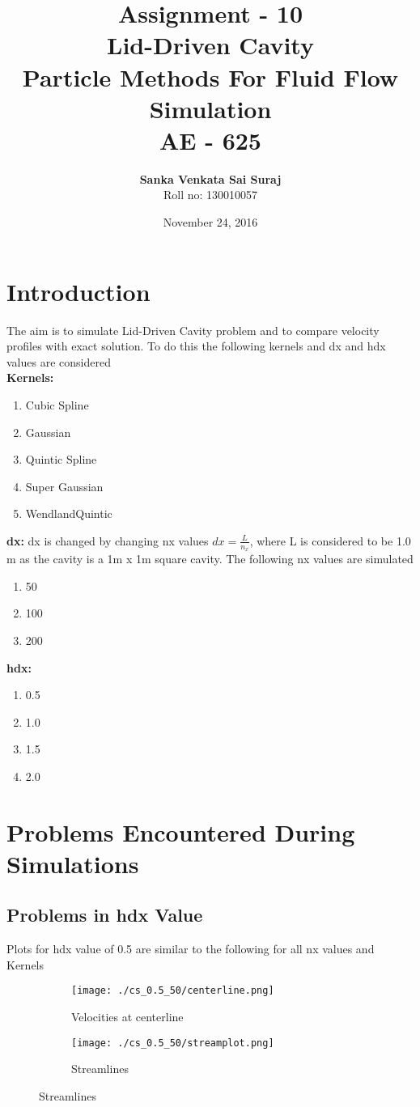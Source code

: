 \documentclass[12pt, a4paper]{report}
\title{\huge \textbf{Assignment - 10} \\[0.2in]
		\large \textbf{Lid-Driven Cavity} \\[0.5in]
		\large Particle Methods For Fluid Flow Simulation \\
		\large \textbf{AE - 625}	}
\author{\textbf{Sanka Venkata Sai Suraj} \\
		Roll no: 130010057 }
\date{November 24, 2016}
\begin{document}
\maketitle
\tableofcontents

\chapter{Introduction}

The aim is to simulate Lid-Driven Cavity problem and to compare velocity profiles with exact solution. To do this the following kernels and dx and hdx values are considered\\
\textbf{Kernels:}
\begin{enumerate}
	\item Cubic Spline
	\item Gaussian
	\item Quintic Spline
	\item Super Gaussian
	\item WendlandQuintic
\end{enumerate} 
\textbf{dx:}
dx is changed by changing nx values $dx = \frac{L}{n_x}$, where L is considered to be 1.0 m as the cavity is a 1m x 1m square cavity. The following nx values are simulated
\begin{enumerate}
	\item 50
	\item 100
	\item 200
\end{enumerate}
\textbf{hdx:}
\begin{enumerate}
	\item 0.5
	\item 1.0
	\item 1.5
	\item 2.0
\end{enumerate}

\chapter{Problems Encountered During Simulations}
\section{Problems in hdx Value}
Plots for hdx value of 0.5 are similar to the following for all nx values and Kernels
\begin{figure}[H]
\begin{subfigure}{0.5\textwidth}
	\texttt{[image: ./cs\_0.5\_50/centerline.png]}
	\caption{Velocities at centerline}
\end{subfigure}
\begin{subfigure}{0.5\textwidth}
	\texttt{[image: ./cs\_0.5\_50/streamplot.png]}
	\caption{Streamlines}
\end{subfigure}
\end{figure}
\end{document}
